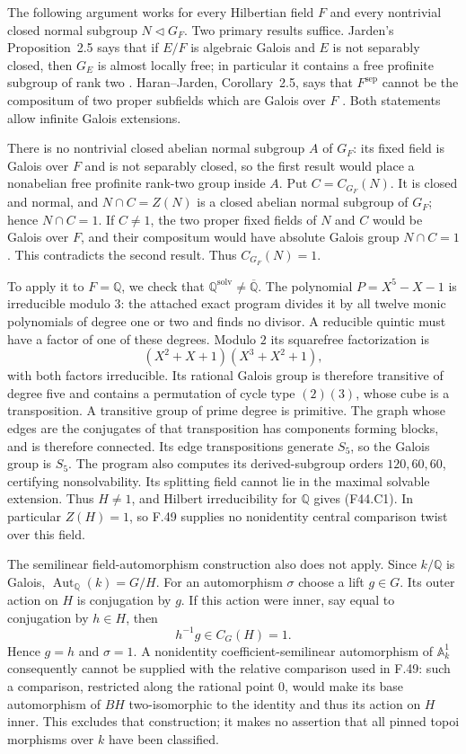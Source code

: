 The following argument works for every Hilbertian field $F$ and
every nontrivial closed normal subgroup $N\triangleleft G_F$.
Two primary results suffice. Jarden's Proposition~2.5 says that if
$E/F$ is algebraic Galois and $E$ is not separably closed, then
$G_E$ is almost locally free; in particular it contains a free
profinite subgroup of rank two
\citep{F44Jarden2011}. Haran--Jarden, Corollary~2.5, says that
$F^{\mathrm{sep}}$ cannot be the compositum of two proper subfields
which are Galois over $F$ \citep{F44HaranJarden1991}. Both statements
allow infinite Galois extensions.

There is no nontrivial closed abelian normal subgroup $A$ of $G_F$:
its fixed field is Galois over $F$ and is not separably closed, so
the first result would place a nonabelian free profinite rank-two
group inside $A$. Put $C=C_{G_F}(N)$. It is closed and normal,
and $N\cap C=Z(N)$ is a closed abelian normal subgroup of $G_F$;
hence $N\cap C=1$. If $C\ne1$, the two proper fixed fields of
$N$ and $C$ would be Galois over $F$, and their compositum would
have absolute Galois group $N\cap C=1$. This contradicts the
second result. Thus $C_{G_F}(N)=1$.

To apply it to $F=\mathbb Q$, we check that
$\mathbb Q^{\mathrm{solv}}\ne\overline{\mathbb Q}$.
The polynomial $P=X^5-X-1$ is irreducible modulo $3$: the attached
exact program divides it by all twelve monic polynomials of degree
one or two and finds no divisor. A reducible quintic must have a
factor of one of these degrees. Modulo $2$ its squarefree
factorization is
\[
           (X^2+X+1)(X^3+X^2+1),
\]
with both factors irreducible. Its rational Galois group is therefore
transitive of degree five and contains a permutation of cycle type
$(2)(3)$, whose cube is a transposition. A transitive group of prime
degree is primitive. The graph whose edges are the conjugates of
that transposition has components forming blocks, and is therefore
connected. Its edge transpositions generate $S_5$, so the Galois
group is $S_5$. The program also computes its derived-subgroup
orders $120,60,60$, certifying nonsolvability. Its splitting field
cannot lie in the maximal solvable extension. Thus $H\ne1$, and
Hilbert irreducibility for $\mathbb Q$ gives (F44.C1).
In particular $Z(H)=1$, so F.49 supplies no nonidentity central
comparison twist over this field.

The semilinear field-automorphism construction also does not apply.
Since $k/\mathbb Q$ is Galois,
$\operatorname{Aut}_{\mathbb Q}(k)=G/H$. For an automorphism
$\sigma$ choose a lift $g\in G$. Its outer action on $H$ is
conjugation by $g$. If this action were inner, say equal to
conjugation by $h\in H$, then
\[
                       h^{-1}g\in C_G(H)=1.
\]
Hence $g=h$ and $\sigma=1$. A nonidentity coefficient-semilinear
automorphism of $\mathbb A^1_k$ consequently cannot be supplied with
the relative comparison used in F.49: such a comparison, restricted
along the rational point $0$, would make its base automorphism of
$BH$ two-isomorphic to the identity and thus its action on $H$
inner. This excludes that construction; it makes no assertion that
all pinned topoi morphisms over $k$ have been classified.


